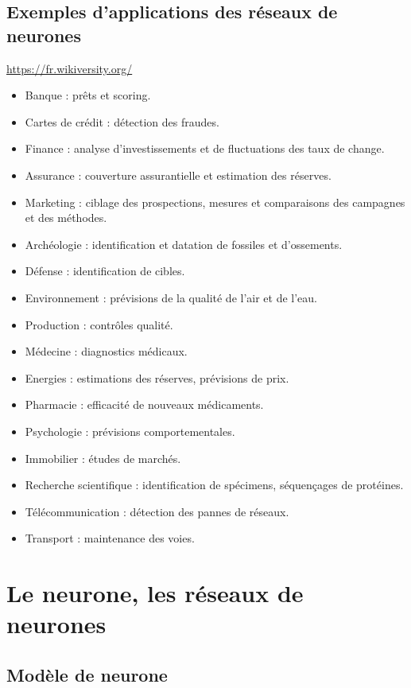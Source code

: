 \subsection{Exemples d'applications des réseaux de neurones}
\url{https://fr.wikiversity.org/}
\begin{itemize}
\item Banque	 : prêts et scoring.
\item Cartes de crédit	: détection des fraudes.
\item Finance	 : analyse d'investissements et de fluctuations des taux de change.
\item Assurance : couverture assurantielle et estimation des réserves.
\item Marketing : ciblage des prospections, mesures et comparaisons des campagnes et des méthodes.
\item Archéologie	 : identification et datation de fossiles et d'ossements.
\item Défense : identification de cibles.
\item Environnement : prévisions de la qualité de l'air et de l'eau.
\item Production : contrôles qualité.
\item Médecine : diagnostics médicaux.
\item Energies : estimations des réserves, prévisions de prix.
\item Pharmacie : efficacité de nouveaux médicaments.
\item Psychologie	: prévisions comportementales.
\item Immobilier : études de marchés.
\item Recherche scientifique : identification de spécimens, séquençages de protéines.
\item Télécommunication : détection des pannes de réseaux.
\item Transport : maintenance des voies.
\end{itemize}

\section{Le neurone, les réseaux de neurones}

\subsection{Modèle de neurone}

